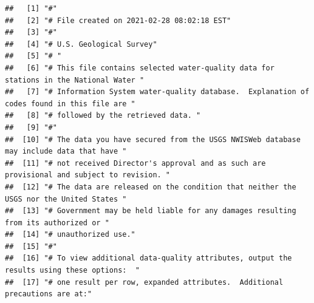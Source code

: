 \documentclass[
]{book}
\begin{document}
\begin{verbatim}
##   [1] "#"                                                                                                                                            
##   [2] "# File created on 2021-02-28 08:02:18 EST"                                                                                                    
##   [3] "#"                                                                                                                                            
##   [4] "# U.S. Geological Survey"                                                                                                                     
##   [5] "# "                                                                                                                                           
##   [6] "# This file contains selected water-quality data for stations in the National Water "                                                         
##   [7] "# Information System water-quality database.  Explanation of codes found in this file are "                                                   
##   [8] "# followed by the retrieved data. "                                                                                                           
##   [9] "#"                                                                                                                                            
##  [10] "# The data you have secured from the USGS NWISWeb database may include data that have "                                                       
##  [11] "# not received Director's approval and as such are provisional and subject to revision. "                                                     
##  [12] "# The data are released on the condition that neither the USGS nor the United States "                                                        
##  [13] "# Government may be held liable for any damages resulting from its authorized or "                                                            
##  [14] "# unauthorized use."                                                                                                                          
##  [15] "#"                                                                                                                                            
##  [16] "# To view additional data-quality attributes, output the results using these options:  "                                                      
##  [17] "# one result per row, expanded attributes.  Additional precautions are at:"                                                                   

\end{verbatim}
\end{document}
